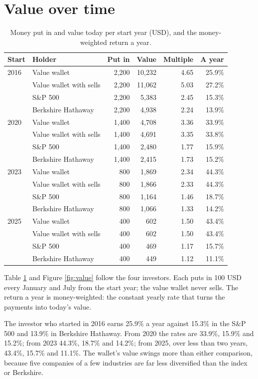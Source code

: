 \documentclass[11pt,a4paper]{article}
\begin{document}
\section{Value over time}
\begin{table}[H]
\centering
\small
\caption{Money put in and value today per start year (USD), and the money-weighted return a year.}\label{tab:value}
\begin{tabular}{l l r r r r}
\hline
Start & Holder & Put in & Value & Multiple & A year \\
\hline
2016 & Value wallet & 2,200 & 10,232 & 4.65 & 25.9\% \\
 & Value wallet with sells & 2,200 & 11,062 & 5.03 & 27.2\% \\
 & S\&P 500 & 2,200 & 5,383 & 2.45 & 15.3\% \\
 & Berkshire Hathaway & 2,200 & 4,938 & 2.24 & 13.9\% \\
\hline
2020 & Value wallet & 1,400 & 4,708 & 3.36 & 33.9\% \\
 & Value wallet with sells & 1,400 & 4,691 & 3.35 & 33.8\% \\
 & S\&P 500 & 1,400 & 2,480 & 1.77 & 15.9\% \\
 & Berkshire Hathaway & 1,400 & 2,415 & 1.73 & 15.2\% \\
\hline
2023 & Value wallet & 800 & 1,869 & 2.34 & 44.3\% \\
 & Value wallet with sells & 800 & 1,866 & 2.33 & 44.3\% \\
 & S\&P 500 & 800 & 1,164 & 1.46 & 18.7\% \\
 & Berkshire Hathaway & 800 & 1,066 & 1.33 & 14.2\% \\
\hline
2025 & Value wallet & 400 & 602 & 1.50 & 43.4\% \\
 & Value wallet with sells & 400 & 602 & 1.50 & 43.4\% \\
 & S\&P 500 & 400 & 469 & 1.17 & 15.7\% \\
 & Berkshire Hathaway & 400 & 449 & 1.12 & 11.1\% \\
\hline
\end{tabular}
\end{table}
Table \ref{tab:value} and Figure \ref{fig:value} follow the four investors. Each puts in 100 USD every January and July from the start year; the value wallet never sells. The return a year is money-weighted: the constant yearly rate that turns the payments into today's value.

The investor who started in 2016 earns 25.9\% a year against 15.3\% in the S\&P 500 and 13.9\% in Berkshire Hathaway. From 2020 the rates are 33.9\%, 15.9\% and 15.2\%; from 2023 44.3\%, 18.7\% and 14.2\%; from 2025, over less than two years, 43.4\%, 15.7\% and 11.1\%. The wallet's value swings more than either comparison, because five companies of a few industries are far less diversified than the index or Berkshire.
\end{document}
